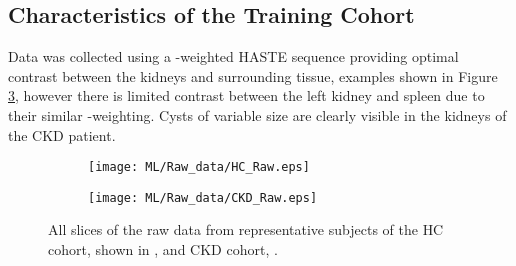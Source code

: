 \subsection{Characteristics of the Training Cohort}

Data was collected using a \ttwo-weighted \ac{HASTE} sequence providing optimal contrast between the kidneys and surrounding tissue, examples shown in Figure \ref{fig:ml_raw}, however there is limited contrast between the left kidney and spleen due to their similar \ttwo-weighting. Cysts of variable size are clearly visible in the kidneys of the \ac{CKD} patient. 

\begin{figure}[H]
	\centering
	\begin{subfigure}[c]{0.47\textwidth}
		\centering
		\texttt{[image: ML/Raw\_data/HC\_Raw.eps]}
		\caption{}
		\label{fig:ml_raw_hc}
	\end{subfigure}
	\hfill
	\begin{subfigure}[c]{0.47\textwidth}
		\centering
		\texttt{[image: ML/Raw\_data/CKD\_Raw.eps]}
		\caption{}
		\label{fig:ml_raw_ckd}
	\end{subfigure}
	\caption{All slices of the raw data from representative subjects of the \ac{HC} cohort, shown in , and \ac{CKD} cohort, .}
	\label{fig:ml_raw}
\end{figure}

